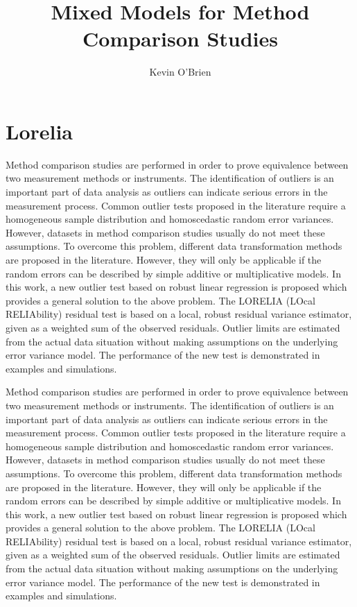 \documentclass[12pt, a4paper]{article}
\begin{document}
\author{Kevin O'Brien}
\title{Mixed Models for Method Comparison Studies}
\tableofcontents

\section{Lorelia}
Method comparison studies are performed in order to prove equivalence between two measurement methods or instruments. 
The identification of outliers is an important part of data analysis as outliers can indicate serious errors in the 
measurement process. Common outlier tests proposed in the literature require a homogeneous sample distribution and 
homoscedastic random error variances. However, datasets in method comparison studies usually do not meet these assumptions. 
To overcome this problem, different data transformation methods are proposed in the literature. However, they will only 
be applicable if the random errors can be described by simple additive or multiplicative models. 
In this work, a new outlier test based on robust linear regression is proposed which provides a general 
solution to the above problem. The LORELIA (LOcal RELIAbility) residual test is based on a local, robust 
residual variance estimator, given as a weighted sum of the observed residuals. Outlier limits are
estimated from the actual data situation without making assumptions on the underlying error variance model. 
The performance of the new test is demonstrated in examples and simulations.

Method comparison studies are performed in order to prove equivalence between two measurement methods or instruments. The identification of outliers is an important part of data analysis as outliers can indicate serious errors in the measurement process. Common outlier tests 
proposed in the literature require a homogeneous sample distribution and homoscedastic random error variances. However, datasets in method comparison studies usually do not meet these assumptions. To overcome this problem, different data transformation methods are proposed in the literature. However, they will only be applicable if the random errors can be described by simple additive or multiplicative models. In this work, a new outlier test based on robust linear regression is proposed which provides a general solution to the above problem. The LORELIA (LOcal RELIAbility) residual test is based on a local, robust residual variance estimator, given as a weighted sum of the observed residuals. Outlier limits are estimated from the actual data situation without making assumptions on the underlying error variance model. The performance of the new test is demonstrated in examples and simulations.
\end{document}
